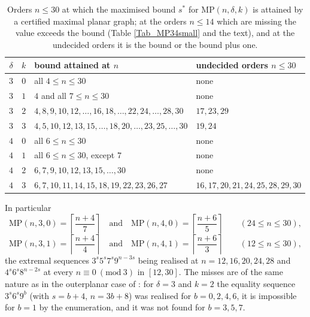 \documentclass[10pt,a4paper]{article}
\begin{document}
\begin{table}[ht]
\begin{center}
\begin{tabular}{|c|c|l|l|}
\hline
$\delta $ & $k$ & bound attained at $n$ & undecided orders $n\leq 30$\\ \hline
$3$ & $0$ & all $4\leq n\leq 30$ & none\\
$3$ & $1$ & $4$ and all $7\leq n\leq 30$ & none\\
$3$ & $2$ & $4,8,9,10,12,\ldots ,16,18,\ldots ,22,24,\ldots ,28,30$ & $17,23,29$\\
$3$ & $3$ & $4,5,10,12,13,15,\ldots ,18,20,\ldots ,23,25,\ldots ,30$ & $19,24$\\
$4$ & $0$ & all $6\leq n\leq 30$ & none\\
$4$ & $1$ & all $6\leq n\leq 30$, except $7$ & none\\
$4$ & $2$ & $6,7,9,10,12,13,15,\ldots ,30$ & none\\
$4$ & $3$ & $6,7,10,11,14,15,18,19,22,23,26,27$ & $16,17,20,21,24,25,28,29,30$\\ \hline
\end{tabular}
\end{center}
\caption{Orders $n\leq 30$ at which the maximised bound $s^{\ast }$ for $\mathrm{MP}(n,\delta ,k)$ is
attained by a certified maximal planar graph; at the orders $n\leq 14$ which are missing the value exceeds
the bound (Table \ref{Tab_MP34small} and the text), and at the undecided orders it is the bound or the
bound plus one.}%
\label{Tab_MP34}%
\end{table}

In particular
\[
\mathrm{MP}(n,3,0)=\left\lceil \frac{n+4}{7}\right\rceil \quad \text{and}\quad \mathrm{MP}(n,4,0)=%
\left\lceil \frac{n+6}{5}\right\rceil \qquad (24\leq n\leq 30),
\]
\[
\mathrm{MP}(n,3,1)=\left\lceil \frac{n+4}{4}\right\rceil \quad \text{and}\quad \mathrm{MP}(n,4,1)=%
\left\lceil \frac{n+6}{3}\right\rceil \qquad (12\leq n\leq 30),
\]
the extremal sequences $3^{s}5^{s}7^{s}9^{n-3s}$ being realised at $n=12,16,20,24,28$ and
$4^{s}6^{s}8^{n-2s}$ at every $n\equiv 0\ (\mathrm{mod}\ 3)$ in $[12,30]$. The misses are of the same
nature as in the outerplanar case of \cite{P1}: for $\delta =3$ and $k=2$ the equality
sequence $3^{s}6^{s}9^{b}$ (with $s=b+4$, $n=3b+8$) was realised for $b=0,2,4,6$, it is impossible
for $b=1$ by the enumeration, and it was not found for $b=3,5,7$.
\end{document}
